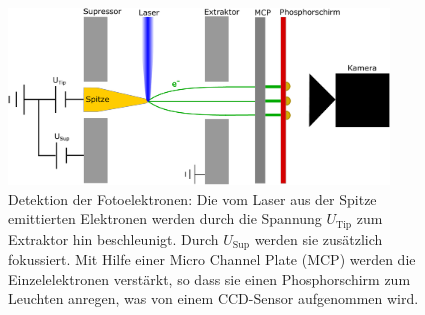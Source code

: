 \documentclass[bachelor,       %
               twoside,        %
               BCOR10mm,       %
               english,ngerman, %
               ]{GAUBM}
\begin{document}
\begin{figure}[h!]
	\centering
	\includegraphics[width=0.9\textwidth]{Kammer_Aufbau}
	\caption{Detektion der Fotoelektronen: Die vom Laser aus der Spitze emittierten Elektronen werden durch die Spannung $U_\text{Tip}$ zum Extraktor hin beschleunigt. Durch $U_\text{Sup}$ werden sie zusätzlich fokussiert. Mit Hilfe einer Micro Channel Plate (MCP) werden die Einzelelektronen verstärkt, so dass sie einen Phosphorschirm zum Leuchten anregen, was von einem CCD-Sensor aufgenommen wird.}
	\label{fig:aufbau_kammer}
\end{figure}
\end{document}
